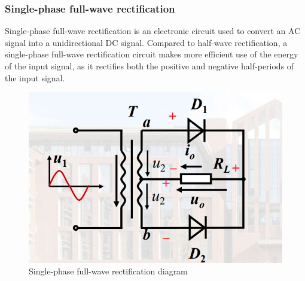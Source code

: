 \documentclass[UTF8]{article}
\begin{document}
   \subsubsection{Single-phase full-wave rectification}
   Single-phase full-wave rectification is an electronic circuit used to convert an AC signal into a unidirectional DC signal. Compared to half-wave rectification, a single-phase full-wave rectification circuit makes more efficient use of the energy of the input signal, as it rectifies both the positive and negative half-periods of the input signal.

    	\begin{figure}[H]
    	    	\centering
    	    	\includegraphics[clip,scale=0.8,trim={0 0 0 0}]{fig/fig7.png}
    	        \caption{Single-phase full-wave rectification diagram}
    	        \label{figure.7}
        \end{figure}  
   
\end{document}
